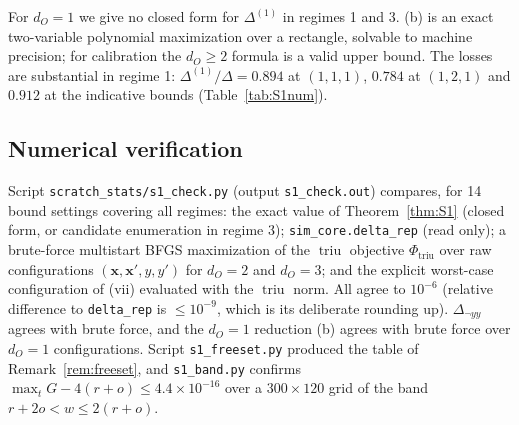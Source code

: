 \documentclass[11pt]{article}
\theoremstyle{definition}
\theoremstyle{plain}
\newcommand{\bx}{\mathbf{x}}
\DeclareMathOperator{\triu}{triu}
\begin{document}
For $d_O=1$ we give no closed form for $\Delta^{(1)}$ in regimes 1 and 3. (b) is an exact two-variable polynomial maximization over a rectangle, solvable to machine precision; for calibration the $d_O\ge2$ formula is a valid upper bound. The losses are substantial in regime 1: $\Delta^{(1)}/\Delta=0.894$ at $(1,1,1)$, $0.784$ at $(1,2,1)$ and $0.912$ at the indicative bounds (Table~\ref{tab:S1num}).

\subsection{Numerical verification}

Script \texttt{scratch\_stats/s1\_check.py} (output \texttt{s1\_check.out}) compares, for 14 bound settings covering all regimes: the exact value of Theorem~\ref{thm:S1} (closed form, or candidate enumeration in regime 3); \texttt{sim\_core.delta\_rep} (read only); a brute-force multistart BFGS maximization of the \emph{$\triu$} objective $\Phi_{\triu}$ over raw configurations $(\bx,\bx',y,y')$ for $d_O=2$ and $d_O=3$; and the explicit worst-case configuration of (vii) evaluated with the $\triu$ norm. All agree to $10^{-6}$ (relative difference to \texttt{delta\_rep} is $\le10^{-9}$, which is its deliberate rounding up). $\Delta_{\neg yy}$ agrees with brute force, and the $d_O=1$ reduction (b) agrees with brute force over $d_O=1$ configurations. Script \texttt{s1\_freeset.py} produced the table of Remark~\ref{rem:freeset}, and \texttt{s1\_band.py} confirms $\max_tG-4(r+o)\le4.4\times10^{-16}$ over a $300\times120$ grid of the band $r+2o<w\le2(r+o)$.
\end{document}
